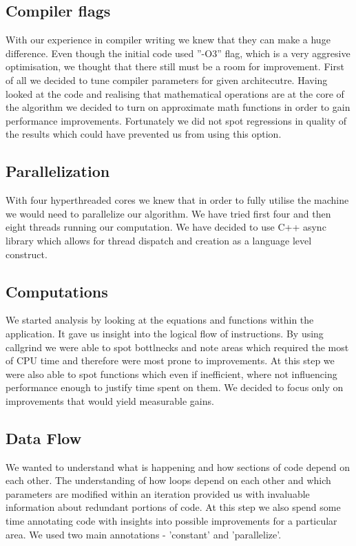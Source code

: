 \documentclass[conference]{IEEEtran}
\begin{document}
\subsection{Compiler flags}
With our experience in compiler writing we knew that they can make a huge difference. Even though the initial code used ''-O3'' flag, which is a very aggresive optimisation, we thought that there still must be a room for improvement. First of all we decided to tune compiler parameters for given architecutre. Having looked at the code and realising that mathematical operations are at the core of the algorithm we decided to turn on approximate math functions in order to gain performance improvements. Fortunately we did not spot regressions in quality of the results which could have prevented us from using this option.

\subsection{Parallelization}
With four hyperthreaded cores we knew that in order to fully utilise the machine we would need to parallelize our algorithm. We have tried first four and then eight threads running our computation. We have decided to use C++ async library which allows for thread dispatch and creation as a language level construct.

\subsection{Computations}
We started analysis by looking at the equations and functions within the application.
It gave us insight into the logical flow of instructions.
By using callgrind we were able to spot bottlnecks and note areas which required the most of CPU time and therefore were most prone to improvements.
At this step we were also able to spot functions which even if inefficient, where not influencing performance enough to justify time spent on them.
We decided to focus only on improvements that would yield measurable gains.

\subsection{Data Flow}
We wanted to understand what is happening and how sections of code depend on each other.
The understanding of how loops depend on each other and which parameters are modified within an iteration provided us with invaluable information about redundant portions of code.
At this step we also spend some time annotating code with insights into possible improvements for a particular area.
We used two main annotations - 'constant' and 'parallelize'.
\end{document}
